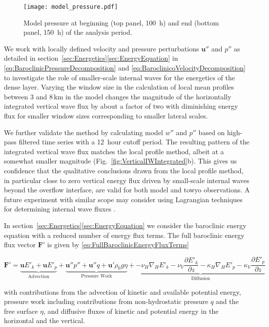 \documentclass{ametsocV6.1}
\begin{document}
\begin{figure}
\centerline{\texttt{[image: model\_pressure.pdf]}}
\caption{Model pressure at beginning (top panel, 100~h) and end (bottom panel, 150~h) of the analysis period.}
\label{fig:ModelPressureComponents}
\end{figure}


\appendix[B]
We work with locally defined velocity and pressure perturbations $\mathbf{u''}$ and $p''$ as detailed in section~\ref{sec:Energetics}\ref{sec:EnergyEquation} in \eqref{eq:BaroclinicPressureDecomposition} and \eqref{eq:BaroclinicoVelocityDecomposition} to investigate the role of smaller-scale internal waves for the energetics of the dense layer.
Varying the window size in the calculation of local mean profiles between 3 and 8\,km in the model changes the magnitude of the horizontally integrated vertical wave flux by about a factor of two with diminishing energy flux for smaller window sizes corresponding to smaller lateral scales.

We further validate the method by calculating model $w''$ and $p''$ based on high-pass filtered time series with a 12~hour cutoff period.
The resulting pattern of the integrated vertical wave flux matches the local profile method, albeit at a somewhat smaller magnitude (Fig.~\ref{fig:VerticalIWIntegrated}b).
This gives us confidence that the qualitative conclusions drawn from the local profile method, in particular close to zero vertical energy flux driven by small-scale internal waves beyond the overflow interface, are valid for both model and towyo observations.
A future experiment with similar scope may consider using Lagrangian techniques for determining internal wave fluxes \citep[e.g.][]{shakespearehogg18, bachmanetal20}.


\appendix[C]
In section~\ref{sec:Energetics}\ref{sec:EnergyEquation} we consider the baroclinic energy equation with a reduced number of energy flux terms. The full baroclinic energy flux vector $\mathbf{F'}$ is given by \eqref{eq:FullBaroclinicEnergyFluxTerms}
\begin{table*}[h!t]
\begin{equation}
\mathbf{F'} = \underbrace{\mathbf{u}E'_k + \mathbf{u}E'_p}_\text{Advection} + \underbrace{\mathbf{u''}p'' + \mathbf{u''}q + \mathbf{u'}\rho_0 g \eta }_\text{Pressure Work} + \underbrace{-\nu_H \nabla_H E'_k -\nu_V \frac{\partial E'_k}{\partial z} - \kappa_H \nabla_H E'_p -\kappa_V \frac{\partial E'_p}{\partial z} }_\text{Diffusion} 
\label{eq:FullBaroclinicEnergyFluxTerms}
\end{equation}
\end{table*}
with contributions from the advection of kinetic and available potential energy, pressure work including contributions from non-hydrostatic pressure $q$ and the free surface $\eta$, and diffusive fluxes of kinetic and potential energy in the horizontal and the vertical.
\end{document}
